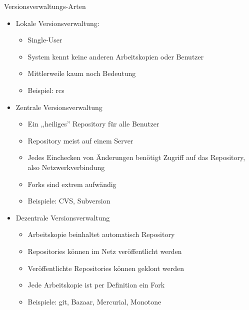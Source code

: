 \begin{frame}[allowframebreaks]{Versionsverwaltungs-Arten}
  \begin{itemize}
    \item Lokale Versionsverwaltung:
    \begin{itemize}
      \item Single-User
      \item System kennt keine anderen Arbeitskopien oder Benutzer
      \item Mittlerweile kaum noch Bedeutung
      \item Beispiel: rcs
    \end{itemize}
    \framebreak

    \item Zentrale Versionsverwaltung
    \begin{itemize}
      \item Ein ,,heiliges'' Repository für alle Benutzer
      \item Repository meist auf einem Server
      \item Jedes Einchecken von Änderungen benötigt Zugriff auf das Repository, also Netzwerkverbindung
      \item Forks sind extrem aufwändig
      \item Beispiele: CVS, Subversion
    \end{itemize}
    \framebreak

    \item Dezentrale Versionsverwaltung
    \begin{itemize}
      \item Arbeitskopie beinhaltet automatisch Repository
      \item Repositories können im Netz veröffentlicht werden
      \item Veröffentlichte Repositories können geklont werden
      \item Jede Arbeitskopie ist per Definition ein Fork
      \item Beispiele: git, Bazaar, Mercurial, Monotone
    \end{itemize}
  \end{itemize}
\end{frame}

